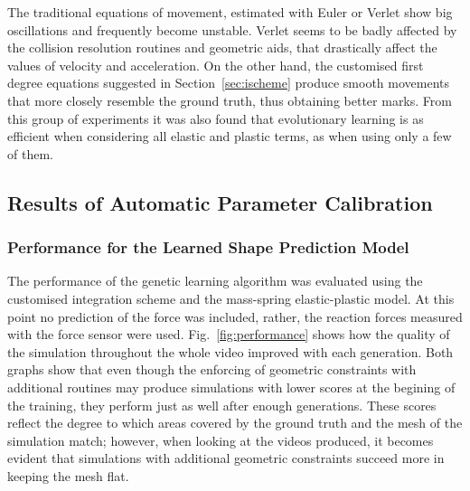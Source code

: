 \documentclass[journal]{IEEEtran}
\newcommand{\fref}[1]{Fig.~\ref{#1}}
\newcommand{\sref}[1]{Section~\ref{#1}}
\newcounter{algorithm}
\newcommand{\comment}[1]{{\color{red} #1}}
\begin{document}
The traditional equations of movement, estimated with Euler or Verlet show big oscillations and frequently become unstable.  Verlet seems to be badly affected by the collision resolution routines and geometric aids, that drastically affect the values of velocity and acceleration.  On the other hand, the customised first degree equations suggested in \sref{sec:ischeme} produce smooth movements that more closely resemble the ground truth, thus obtaining better marks.  From this group of experiments it was also found that evolutionary learning is as efficient when considering all elastic and plastic terms, as when using only a few of them.

\subsection{\comment{Results of Automatic Parameter Calibration}}
\subsubsection{\comment{Performance for the Learned Shape Prediction Model}}
The performance of the genetic learning algorithm was evaluated using the customised integration scheme and the mass-spring elastic-plastic model.  At this point no prediction of the force was included, rather, the reaction forces measured with the force sensor were used.  \fref{fig:performance} shows how the quality of the simulation throughout the whole video improved with each generation.  Both graphs show that even though the enforcing of geometric constraints with additional routines may produce simulations with lower scores at the begining of the training, they perform just as well after enough generations.  These scores reflect the degree to which areas covered by the ground truth and the mesh of the simulation match; however, when looking at the videos produced, it becomes evident that simulations with additional geometric constraints succeed more in keeping the mesh flat. %
\end{document}
